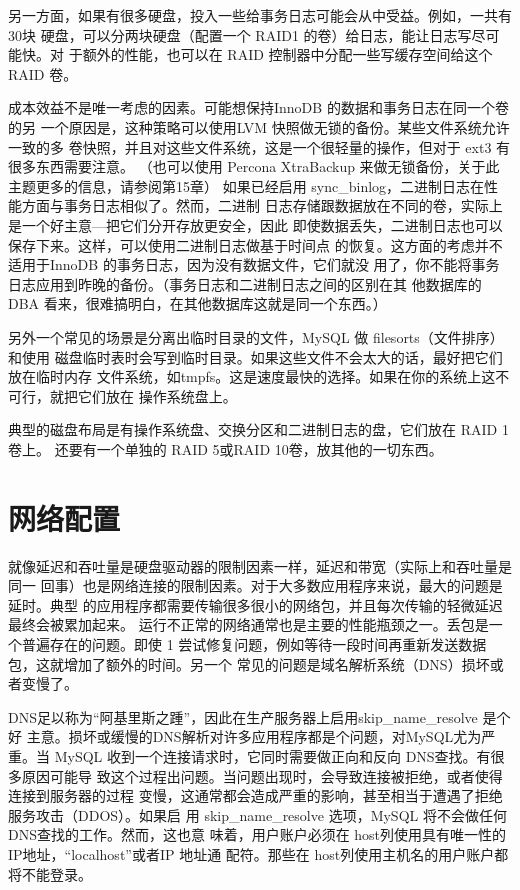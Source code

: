另一方面，如果有很多硬盘，投入一些给事务日志可能会从中受益。例如，一共有30块
硬盘，可以分两块硬盘（配置一个 RAID1 的卷）给日志，能让日志写尽可能快。对
于额外的性能，也可以在 RAID 控制器中分配一些写缓存空间给这个 RAID 卷。

成本效益不是唯一考虑的因素。可能想保持InnoDB 的数据和事务日志在同一个卷的另
一个原因是，这种策略可以使用LVM 快照做无锁的备份。某些文件系统允许一致的多
卷快照，并且对这些文件系统，这是一个很轻量的操作，但对于 ext3 有很多东西需要注意。
（也可以使用 Percona XtraBackup 来做无锁备份，关于此主题更多的信息，请参阅第15章）
如果已经启用 sync\_binlog，二进制日志在性能方面与事务日志相似了。然而，二进制
日志存储跟数据放在不同的卷，实际上是一个好主意—把它们分开存放更安全，因此
即使数据丢失，二进制日志也可以保存下来。这样，可以使用二进制日志做基于时间点
的恢复。这方面的考虑并不适用于InnoDB 的事务日志，因为没有数据文件，它们就没
用了，你不能将事务日志应用到昨晚的备份。（事务日志和二进制日志之间的区别在其
他数据库的 DBA 看来，很难搞明白，在其他数据库这就是同一个东西。）

另外一个常见的场景是分离出临时目录的文件，MySQL 做 filesorts（文件排序）和使用
磁盘临时表时会写到临时目录。如果这些文件不会太大的话，最好把它们放在临时内存
文件系统，如tmpfs。这是速度最快的选择。如果在你的系统上这不可行，就把它们放在
操作系统盘上。

典型的磁盘布局是有操作系统盘、交换分区和二进制日志的盘，它们放在 RAID 1卷上。
还要有一个单独的 RAID 5或RAID 10卷，放其他的一切东西。

\section{网络配置}
就像延迟和吞吐量是硬盘驱动器的限制因素一样，延迟和带宽（实际上和吞吐量是同一
回事）也是网络连接的限制因素。对于大多数应用程序来说，最大的问题是延时。典型
的应用程序都需要传输很多很小的网络包，并且每次传输的轻微延迟最终会被累加起来。
运行不正常的网络通常也是主要的性能瓶颈之一。丢包是一个普遍存在的问题。即使
1%
尝试修复问题，例如等待一段时间再重新发送数据包，这就增加了额外的时间。另一个
常见的问题是域名解析系统（DNS）损坏或者变慢了。

DNS足以称为“阿基里斯之踵”，因此在生产服务器上启用skip\_name\_resolve 是个好
主意。损坏或缓慢的DNS解析对许多应用程序都是个问题，对MySQL尤为严重。当
MySQL 收到一个连接请求时，它同时需要做正向和反向 DNS查找。有很多原因可能导
致这个过程出问题。当问题出现时，会导致连接被拒绝，或者使得连接到服务器的过程
变慢，这通常都会造成严重的影响，甚至相当于遭遇了拒绝服务攻击（DDOS）。如果启
用 skip\_name\_resolve 选项，MySQL 将不会做任何DNS查找的工作。然而，这也意
味着，用户账户必须在 host列使用具有唯一性的IP地址，“localhost”或者IP 地址通
配符。那些在 host列使用主机名的用户账户都将不能登录。

